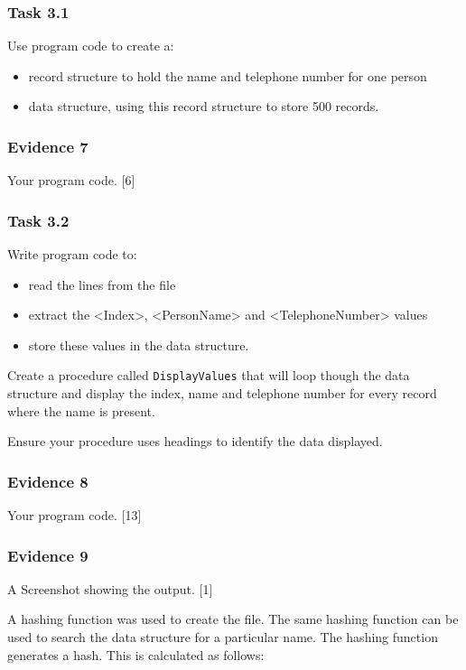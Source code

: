 \subsubsection*{Task 3.1}

Use program code to create a:
\begin{itemize}
\item record structure to hold the name and telephone number for one person
\item data structure, using this record structure to store 500 records.
\end{itemize}

\subsubsection*{Evidence 7}

Your program code. \hfill{}{[}6{]}

\subsubsection*{Task 3.2}

Write program code to:
\begin{itemize}
\item read the lines from the file
\item extract the <Index>, <PersonName> and <TelephoneNumber> values
\item store these values in the data structure.
\end{itemize}
Create a procedure called \texttt{DisplayValues} that will loop though
the data structure and display the index, name and telephone number
for every record where the name is present.

Ensure your procedure uses headings to identify the data displayed.

\subsubsection*{Evidence 8}

Your program code. \hfill{}{[}13{]}

\subsubsection*{Evidence 9}

A Screenshot showing the output.\hfill{} {[}1{]}

A hashing function was used to create the file. The same hashing function
can be used to search the data structure for a particular name. The
hashing function generates a hash. This is calculated as follows:

